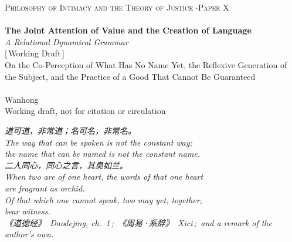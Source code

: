 \documentclass[11pt,a4paper]{article}
\begin{document}
\thispagestyle{empty}
\begin{center}
\vspace*{2cm}
{\footnotesize\color{rosedeep}\scshape Philosophy of Intimacy and the Theory of Justice \quad$\cdot$\quad Paper X}\\[0.3cm]
\coverrule\\[1.2cm]
{\LARGE\bfseries\color{warnred} The Joint Attention of Value and the Creation of Language}\\[0.8cm]
{\large\itshape\color{warnred} A Relational Dynamical Grammar}\\[0.8cm]
{\small\color{gold} [\,Working Draft\,]}\\[0.8cm]
{\normalsize\color{inksoft} On the Co-Perception of What Has No Name Yet, the Reflexive Generation of the Subject, and the Practice of a Good That Cannot Be Guaranteed}\\[2cm]
\coverrule[0.25]\\[0.6cm]
{\normalsize\color{inksoft} Wanhong}\\
\vfill
{\footnotesize\color{gold} Working draft, not for citation or circulation}
\coverfootnote
\end{center}
\newpage

\thispagestyle{empty}
\vspace*{2.4cm}
\begin{center}
\begin{minipage}{0.76\linewidth}
\centering\itshape\color{rose}
{\cjk 道可道，非常道；名可名，非常名。}\\[0.3em]
The way that can be spoken is not the constant way;\\the name that can be named is not the constant name.\\[0.8em]
{\cjk 二人同心，同心之言，其臭如兰。}\\[0.3em]
When two are of one heart, the words of that one heart\\are fragrant as orchid.\\[0.8em]
\upshape Of that which one cannot speak, two may yet, together,\\ bear witness.\\[0.6em]
{\upshape\footnotesize\color{gold} {\cjk《道德经》}\ \emph{Daodejing}, ch.~1\,;\ {\cjk《周易·系辞》}\ \emph{Xici}\,;\ and a remark of the author's own.}
\end{minipage}
\end{center}
\newpage
\end{document}
